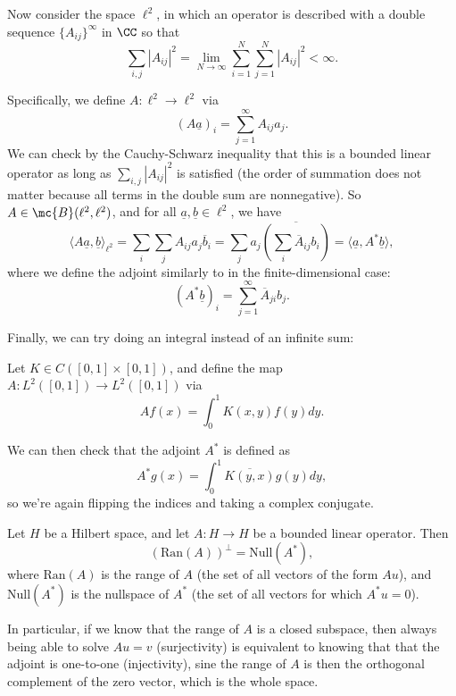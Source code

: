 \begin{example}
Now consider the space $\ell^2$, in which an operator is described with a double sequence $\{A_{ij}\}^\infty$ in $\CC$ so that 
\[
    \sum_{i,j} |A_{ij}|^2 = \lim_{N \to \infty} \sum_{i=1}^N \sum_{j=1}^N |A_{ij}|^2 < \infty.
\]
\end{example}

Specifically, we define $A: \ell^2 \to \ell^2$ via
\[
    (A \underline{a})_i = \sum_{j=1}^{\infty} A_{ij} a_j.
\]
We can check by the Cauchy-Schwarz inequality that this is a bounded linear operator as long as $\sum_{i,j} |A_{ij}|^2$ is satisfied (the order of summation does not matter because all terms in the double sum are nonnegative). So $A \in \mc{B}(\ell^2, \ell^2)$, and for all $\underline{a}, \underline{b} \in \ell^2$, we have
\[
    \langle A \underline{a}, \underline{b} \rangle_{\ell^2} = \sum_i \sum_j A_{ij} a_j \overline{b}_i = \sum_j a_j \overline{\left(\sum_i \overline{A}_{ij} b_i \right)} = \langle \underline{a}, A^\ast \underline{b} \rangle,
\]
where we define the adjoint similarly to in the finite-dimensional case:
\[
    (A^\ast\underline{b})_i = \sum_{j=1}^{\infty} \overline{A}_{ji} b_j.
\]

Finally, we can try doing an integral instead of an infinite sum:

\begin{example}
Let $K \in C([0, 1] \times [0, 1])$, and define the map $A: L^2([0, 1]) \to L^2([0, 1])$ via
\[
    Af(x) = \int_0^1 K(x, y) f(y) dy.
\]
\end{example}

We can then check that the adjoint $A^\ast$ is defined as
\[
    A^\ast g(x) = \int_0^1 \overline{K(y, x)} g(y) dy,
\]
so we're again flipping the indices and taking a complex conjugate. 

\begin{theorem}
Let $H$ be a Hilbert space, and let $A: H \to H$ be a bounded linear operator. Then 
\[
    (\text{Ran}(A))^\perp = \text{Null}(A^\ast),
\]
where $\text{Ran}(A)$ is the range of $A$ (the set of all vectors of the form $Au$), and $\text{Null}(A^\ast)$ is the nullspace of $A^\ast$ (the set of all vectors for which $A^\ast u = 0$).
\end{theorem}

In particular, if we know that the range of $A$ is a closed subspace, then always being able to solve $Au = v$ (surjectivity) is equivalent to knowing that that the adjoint is one-to-one (injectivity), sine the range of $A$ is then the orthogonal complement of the zero vector, which is the whole space. 

